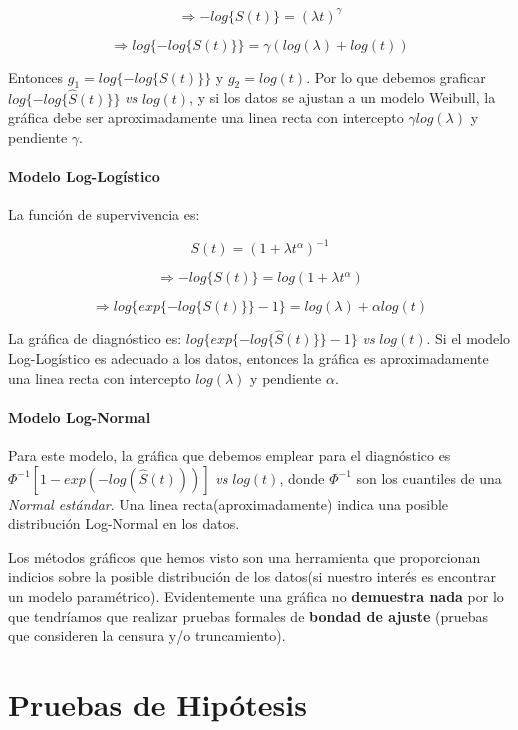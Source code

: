 \documentclass[
  a4paper,
  oneside,
  openany]{book}
\begin{document}
\[
\Longrightarrow -log\{S(t)\}=(\lambda t)^{\gamma}
\]

\[
\Longrightarrow log\{-log\{S(t)\}\}=\gamma (log(\lambda)+log(t))
\]

Entonces \(g_1=log\{-log\{S(t)\}\}\) y \(g_2=log(t)\). Por lo que debemos graficar \(log\{-log\{\hat S(t)\}\}\) \emph{vs} \(log(t)\), y si los datos se ajustan a un modelo Weibull, la gráfica debe ser aproximadamente una linea recta con intercepto \(\gamma log(\lambda)\) y pendiente \(\gamma\).

\hypertarget{modelo-log-loguxedstico-1}{%
\subsubsection*{Modelo Log-Logístico}\label{modelo-log-loguxedstico-1}}


La función de supervivencia es:

\[
S(t)=(1+\lambda t^{\alpha})^{-1}
\]

\[
\Longrightarrow -log\{S(t)\}=log(1+\lambda t^{\alpha})
\]

\[
\Longrightarrow log\{exp\{-log\{S(t)\}\}-1\}=log(\lambda)+\alpha log(t)
\]

La gráfica de diagnóstico es: \(log\{exp\{-log\{\hat S(t)\}\}-1\}\) \emph{vs} \(log(t)\). Si el modelo Log-Logístico es adecuado a los datos, entonces la gráfica es aproximadamente una linea recta con intercepto \(log(\lambda)\) y pendiente \(\alpha\).

\hypertarget{modelo-log-normal-1}{%
\subsubsection*{Modelo Log-Normal}\label{modelo-log-normal-1}}


Para este modelo, la gráfica que debemos emplear para el diagnóstico es \(\Phi^{-1}[1-exp(-log(\hat S(t)))]\) \emph{vs} \(log(t)\), donde \(\Phi^{-1}\) son los cuantiles de una \emph{Normal estándar}. Una linea recta(aproximadamente) indica una posible distribución Log-Normal en los datos.

Los métodos gráficos que hemos visto son una herramienta que proporcionan indicios sobre la posible distribución de los datos(si nuestro interés es encontrar un modelo paramétrico). Evidentemente una gráfica no \textbf{demuestra nada} por lo que tendríamos que realizar pruebas formales de \textbf{bondad de ajuste} (pruebas que consideren la censura y/o truncamiento).

\hypertarget{pruebas-de-hipuxf3tesis}{%
\chapter{Pruebas de Hipótesis}\label{pruebas-de-hipuxf3tesis}}
\end{document}
